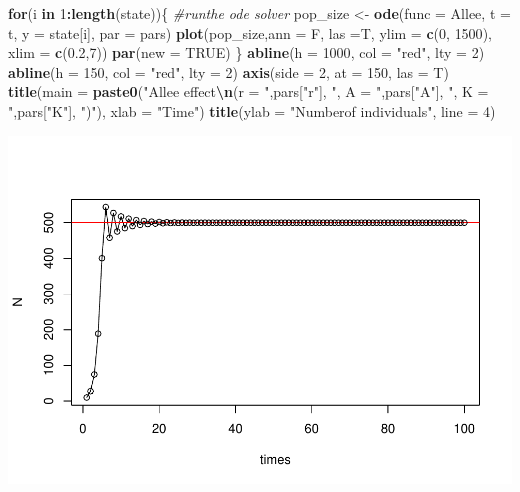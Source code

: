 \documentclass[
]{book}
\newenvironment{Shaded}{\begin{snugshade}}{\end{snugshade}}
\newcommand{\AttributeTok}[1]{\textcolor[rgb]{0.13,0.29,0.53}{#1}}
\newcommand{\CommentTok}[1]{\textcolor[rgb]{0.56,0.35,0.01}{\textit{#1}}}
\newcommand{\ConstantTok}[1]{\textcolor[rgb]{0.56,0.35,0.01}{#1}}
\newcommand{\ControlFlowTok}[1]{\textcolor[rgb]{0.13,0.29,0.53}{\textbf{#1}}}
\newcommand{\DecValTok}[1]{\textcolor[rgb]{0.00,0.00,0.81}{#1}}
\newcommand{\FloatTok}[1]{\textcolor[rgb]{0.00,0.00,0.81}{#1}}
\newcommand{\FunctionTok}[1]{\textcolor[rgb]{0.13,0.29,0.53}{\textbf{#1}}}
\newcommand{\NormalTok}[1]{#1}
\newcommand{\OtherTok}[1]{\textcolor[rgb]{0.56,0.35,0.01}{#1}}
\newcommand{\SpecialCharTok}[1]{\textcolor[rgb]{0.81,0.36,0.00}{\textbf{#1}}}
\newcommand{\StringTok}[1]{\textcolor[rgb]{0.31,0.60,0.02}{#1}}
\begin{document}
\begin{Shaded}
\begin{Highlighting}[]
\ControlFlowTok{for}\NormalTok{(i }\ControlFlowTok{in} \DecValTok{1}\SpecialCharTok{:}\FunctionTok{length}\NormalTok{(state))\{}
  \CommentTok{\#runthe ode solver}
\NormalTok{  pop\_size }\OtherTok{\textless{}{-}} \FunctionTok{ode}\NormalTok{(}\AttributeTok{func =}\NormalTok{ Allee, }\AttributeTok{t =}\NormalTok{ t, }\AttributeTok{y =}\NormalTok{ state[i], }\AttributeTok{par =}\NormalTok{ pars)}
  \FunctionTok{plot}\NormalTok{(pop\_size,}\AttributeTok{ann =}\NormalTok{ F, }\AttributeTok{las =}\NormalTok{T, }\AttributeTok{ylim =} \FunctionTok{c}\NormalTok{(}\DecValTok{0}\NormalTok{, }\DecValTok{1500}\NormalTok{), }\AttributeTok{xlim =} \FunctionTok{c}\NormalTok{(}\FloatTok{0.2}\NormalTok{,}\DecValTok{7}\NormalTok{))}
  \FunctionTok{par}\NormalTok{(}\AttributeTok{new =} \ConstantTok{TRUE}\NormalTok{)}
\NormalTok{\}}
\FunctionTok{abline}\NormalTok{(}\AttributeTok{h =} \DecValTok{1000}\NormalTok{, }\AttributeTok{col =} \StringTok{"red"}\NormalTok{, }\AttributeTok{lty =} \DecValTok{2}\NormalTok{)}
\FunctionTok{abline}\NormalTok{(}\AttributeTok{h =} \DecValTok{150}\NormalTok{, }\AttributeTok{col =} \StringTok{"red"}\NormalTok{, }\AttributeTok{lty =} \DecValTok{2}\NormalTok{)}
\FunctionTok{axis}\NormalTok{(}\AttributeTok{side =} \DecValTok{2}\NormalTok{, }\AttributeTok{at =} \DecValTok{150}\NormalTok{, }\AttributeTok{las =}\NormalTok{ T)}
\FunctionTok{title}\NormalTok{(}\AttributeTok{main =} \FunctionTok{paste0}\NormalTok{(}\StringTok{"Allee effect}\SpecialCharTok{\textbackslash{}n}\StringTok{(r = "}\NormalTok{,pars[}\StringTok{"r"}\NormalTok{],}
                  \StringTok{", A = "}\NormalTok{,pars[}\StringTok{"A"}\NormalTok{],}
                  \StringTok{", K = "}\NormalTok{,pars[}\StringTok{"K"}\NormalTok{], }\StringTok{")"}\NormalTok{),}
      \AttributeTok{xlab =} \StringTok{"Time"}\NormalTok{)}
\FunctionTok{title}\NormalTok{(}\AttributeTok{ylab =} \StringTok{"Numberof individuals"}\NormalTok{, }\AttributeTok{line =} \DecValTok{4}\NormalTok{)}
\end{Highlighting}
\end{Shaded}

\includegraphics{bookdown-demo_files/figure-latex/unnamed-chunk-15-1.pdf}
\end{document}
